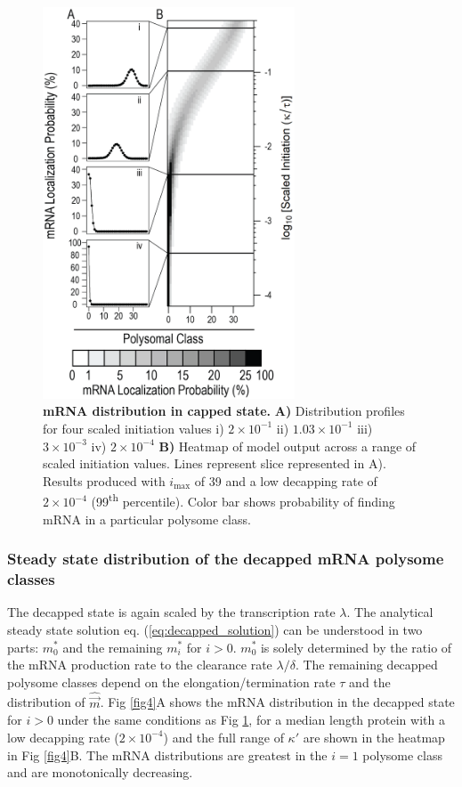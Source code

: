 \documentclass[10pt,letterpaper]{article}
\newcommand{\imax}{\ensuremath{{i_{\max}}}\xspace}
\newcommand{\mvec}{\ensuremath{\vec{m}}\xspace}
\newcommand{\mvechat}{\ensuremath{\hat{\mvec}}\xspace}
\begin{document}
\begin{figure}[!h]
\begin{center}
\includegraphics[width=75mm]{Images/2023-07-04_Unmarked_slices.png}
\caption{{\bf mRNA distribution in capped state.} {\bf A)} Distribution profiles for four scaled initiation values i) $2\times 10^{-1}$ ii) $1.03\times 10^{-1}$ iii) $3\times 10^{-3}$ iv) $2\times 10^{-4}$ {\bf B)} Heatmap of model output across a range of scaled initiation values. Lines represent slice represented in A). Results produced with \imax of 39 and a low decapping rate of $2\times10^{-4}$  (99\textsuperscript{th} percentile). Color bar shows probability of finding mRNA in a particular polysome class.}
\label{fig3}
\end{center}
\end{figure}


\subsubsection*{Steady state distribution of the decapped mRNA polysome classes}
The decapped state is again scaled by the transcription rate $\lambda$.
The analytical steady state solution eq. (\ref{eq:decapped_solution}) can be understood in two parts: $m_0^*$ and the remaining $m_i^*$ for $i>0$.
$m_0^*$ is solely determined by the ratio of the mRNA production rate to the clearance rate $\lambda / \delta$.
The remaining decapped polysome classes depend on the elongation/termination rate $\tau$ and the distribution of \mvechat.
 Fig \ref{fig4}A shows the mRNA distribution in the decapped state for $i>0$ under the same conditions as Fig \ref{fig3}, for a median length protein with a low decapping rate ($2\times10^{-4}$) and the full range of $\kappa'$ are shown in the heatmap in Fig \ref{fig4}B.
The mRNA distributions are greatest in the $i=1$ polysome class and are monotonically decreasing. 
 
\end{document}

